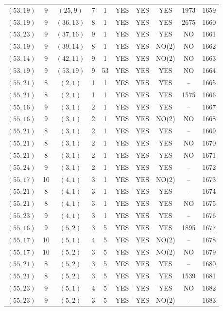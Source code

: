 \begin{longtable}{|c|c|c|c|c|c|c|c|c|c|}
$(53, 19)$ & 9 & $(25, 9)$ & 7 & 1 & YES & YES & YES & 1973 & 1659\\
$(53, 19)$ & 9 & $(36, 13)$ & 8 & 1 & YES & YES & YES & 2675 & 1660\\
$(53, 23)$ & 9 & $(37, 16)$ & 9 & 1 & YES & YES & YES & NO & 1661\\
$(53, 19)$ & 9 & $(39, 14)$ & 8 & 1 & YES & YES & NO(2) & NO & 1662\\
$(53, 14)$ & 9 & $(42, 11)$ & 9 & 1 & YES & YES & NO(2) & NO & 1663\\
$(53, 19)$ & 9 & $(53, 19)$ & 9 & 53 & YES & YES & YES & NO & 1664\\
$(55, 21)$ & 8 & $(2, 1)$ & 1 & 1 & YES & YES & YES & -- & 1665\\
$(55, 21)$ & 8 & $(2, 1)$ & 1 & 1 & YES & YES & YES & 1575 & 1666\\
$(55, 16)$ & 9 & $(3, 1)$ & 2 & 1 & YES & YES & YES & -- & 1667\\
$(55, 16)$ & 9 & $(3, 1)$ & 2 & 1 & YES & YES & NO(2) & NO & 1668\\
$(55, 21)$ & 8 & $(3, 1)$ & 2 & 1 & YES & YES & YES & -- & 1669\\
$(55, 21)$ & 8 & $(3, 1)$ & 2 & 1 & YES & YES & YES & NO & 1670\\
$(55, 21)$ & 8 & $(3, 1)$ & 2 & 1 & YES & YES & YES & NO & 1671\\
$(55, 24)$ & 9 & $(3, 1)$ & 2 & 1 & YES & YES & YES & -- & 1672\\
$(55, 17)$ & 10 & $(4, 1)$ & 3 & 1 & YES & YES & NO(2) & -- & 1673\\
$(55, 21)$ & 8 & $(4, 1)$ & 3 & 1 & YES & YES & YES & -- & 1674\\
$(55, 21)$ & 8 & $(4, 1)$ & 3 & 1 & YES & YES & YES & NO & 1675\\
$(55, 23)$ & 9 & $(4, 1)$ & 3 & 1 & YES & YES & YES & -- & 1676\\
$(55, 16)$ & 9 & $(5, 2)$ & 3 & 5 & YES & YES & YES & 1895 & 1677\\
$(55, 17)$ & 10 & $(5, 1)$ & 4 & 5 & YES & YES & NO(2) & -- & 1678\\
$(55, 17)$ & 10 & $(5, 2)$ & 3 & 5 & YES & YES & NO(2) & NO & 1679\\
$(55, 21)$ & 8 & $(5, 2)$ & 3 & 5 & YES & YES & YES & -- & 1680\\
$(55, 21)$ & 8 & $(5, 2)$ & 3 & 5 & YES & YES & YES & 1539 & 1681\\
$(55, 23)$ & 9 & $(5, 1)$ & 4 & 5 & YES & YES & YES & NO & 1682\\
$(55, 23)$ & 9 & $(5, 2)$ & 3 & 5 & YES & YES & NO(2) & -- & 1683\\

\end{longtable}
